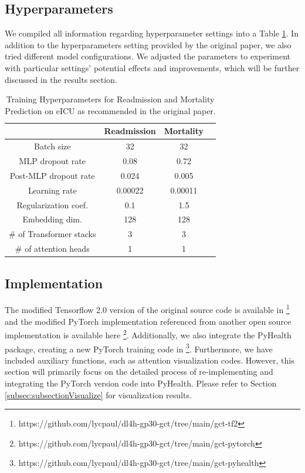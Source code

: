 \documentclass[11pt,a4paper]{article}
\begin{document}
\subsection{Hyperparameters}
We compiled all information regarding hyperparameter settings into a Table  \ref{tab:table}. In addition to the hyperparameters setting provided by the original paper, we also tried different model configurations. We adjusted the parameters to experiment with particular settings' potential effects and improvements, which will be further discussed in the results section.

\begin{table}[h]
\centering
\begin{tabular}{c c c c}
\hline
 & Readmission & Mortality \\
\hline
Batch size & 32 & 32 \\
\hline
MLP dropout rate & 0.08 &  0.72\\
\hline
Post-MLP dropout rate & 0.024 &  0.005\\
\hline
Learning rate & 0.00022 & 0.00011 \\
\hline
Regularization coef. & 0.1 &  1.5\\
\hline
Embedding dim. & 128 & 128 \\
\hline
\# of Transformer stacks & 3 & 3 \\
\hline
\# of attention heads & 1 & 1 \\
\end{tabular}
\caption{Training Hyperparameters for Readmission and Mortality Prediction on eICU as recommended in the original paper.}
\label{tab:table}
\end{table} 

\subsection{Implementation}
The modified Tensorflow 2.0 version of the original source code is available in \footnote{https://github.com/lycpaul/dl4h-gp30-gct/tree/main/gct-tf2} and the modified PyTorch implementation referenced from another open source implementation is available here \footnote{https://github.com/lycpaul/dl4h-gp30-gct/tree/main/gct-pytorch}. Additionally, we also integrate the PyHealth package, creating a new PyTorch training code in \footnote{https://github.com/lycpaul/dl4h-gp30-gct/tree/main/gct-pyhealth}. Furthermore, we have included auxiliary functions, such as attention visualization codes. However, this section will primarily focus on the detailed process of re-implementing and integrating the PyTorch version code into PyHealth. Please refer to Section \ref{subsec:subsectionVisualize} for visualization results.
\end{document}
